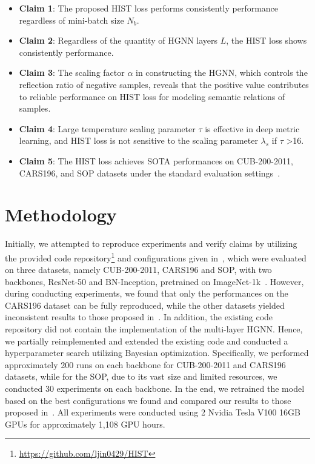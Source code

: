 \begin{itemize}
    \item \textbf{Claim 1}: The proposed HIST loss performs consistently performance regardless of mini-batch size $N_b$.
    \item \textbf{Claim 2}: Regardless of the quantity of HGNN layers $L$, the HIST loss shows consistently performance.
    \item \textbf{Claim 3}: The scaling factor $\alpha$ in constructing the HGNN, which controls the reflection ratio of negative samples, reveals that the positive value contributes to reliable performance on HIST loss for modeling semantic relations of samples.
    \item \textbf{Claim 4}: Large temperature scaling parameter $\tau$ is effective in deep metric learning, and HIST loss is not sensitive to the scaling parameter $\lambda_s$ if $\tau$ >16.
    \item \textbf{Claim 5}: The HIST loss achieves SOTA performances on CUB-200-2011, CARS196, and SOP datasets under the standard evaluation settings~\cite{kim2020proxy,oh2016deep,qian2019softtriple, wang2019multi}.
\end{itemize}

\section{Methodology}
Initially, we attempted to reproduce experiments and verify claims by utilizing the provided code repository\footnote{\url{https://github.com/ljin0429/HIST}} and configurations given in~\cite{lim2022hypergraph}, which were evaluated on three datasets, namely CUB-200-2011, CARS196 and SOP, with two backbones, ResNet-50\cite{he2016deep} and BN-Inception\cite{ioffe2015batch}, pretrained on ImageNet-1k~\cite{deng2009imagenet}. However, during conducting experiments, we found that only the performances on the CARS196 dataset can be fully reproduced, while the other datasets yielded inconsistent results to those proposed in~\cite{lim2022hypergraph}. In addition, the existing code repository did not contain the implementation of the multi-layer HGNN. Hence, we partially reimplemented and extended the existing code and conducted a hyperparameter search utilizing Bayesian optimization. Specifically, we performed approximately 200 runs on each backbone for CUB-200-2011 and CARS196 datasets, while for the SOP, due to its vast size and limited resources, we conducted 30 experiments on each backbone. In the end, we retrained the model based on the best configurations we found and compared our results to those proposed in~\cite{lim2022hypergraph}. All experiments were conducted using 2 Nvidia Tesla V100 16GB GPUs for approximately 1,108 GPU hours.

